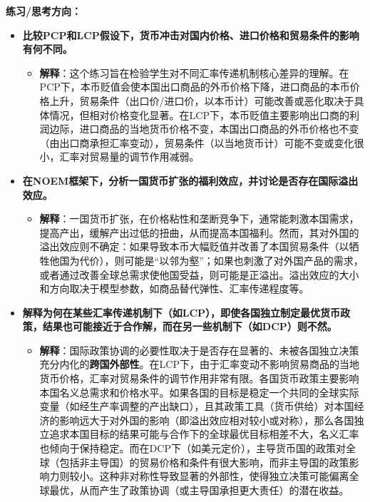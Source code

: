 \documentclass[12pt]{article}
\begin{document}
\textbf{练习/思考方向：}
\begin{itemize}
    \item \textbf{比较PCP和LCP假设下，货币冲击对国内价格、进口价格和贸易条件的影响有何不同。}
    \begin{itemize}
        \item \textbf{解释}：这个练习旨在检验学生对不同汇率传递机制核心差异的理解。在PCP下，本币贬值会使本国出口商品的外币价格下降，进口商品的本币价格上升，贸易条件（出口价/进口价，以本币计）可能改善或恶化取决于具体情况，但相对价格变化显著。在LCP下，本币贬值主要影响出口商的利润边际，进口商品的当地货币价格不变，本国出口商品的外币价格也不变（由出口商承担汇率变动），贸易条件（以当地货币计）可能不变或变化很小，汇率对贸易量的调节作用减弱。
    \end{itemize}
    \item \textbf{在NOEM框架下，分析一国货币扩张的福利效应，并讨论是否存在国际溢出效应。}
    \begin{itemize}
        \item \textbf{解释}：一国货币扩张，在价格粘性和垄断竞争下，通常能刺激本国需求，提高产出，缓解产出过低的扭曲，从而提高本国福利。然而，其对外国的溢出效应则不确定：如果导致本币大幅贬值并改善了本国贸易条件（以牺牲他国为代价），则可能是“以邻为壑”；如果也刺激了对外国产品的需求，或者通过改善全球总需求使他国受益，则可能是正溢出。溢出效应的大小和方向取决于模型参数，如商品替代弹性、汇率传递程度等。
    \end{itemize}
    \item \textbf{解释为何在某些汇率传递机制下（如LCP），即使各国独立制定最优货币政策，结果也可能接近于合作解，而在另一些机制下（如DCP）则不然。}
    \begin{itemize}
        \item \textbf{解释}：国际政策协调的必要性取决于是否存在显著的、未被各国独立决策充分内化的\textbf{跨国外部性}。在LCP下，由于汇率变动不影响贸易商品的当地货币价格，汇率对贸易条件的调节作用非常有限。各国货币政策主要影响本国名义总需求和价格水平。如果各国的目标是稳定一个共同的全球实际变量（如经生产率调整的产出缺口），且其政策工具（货币供给）对本国经济的影响远大于对外国的影响（即溢出效应相对较小或对称），那么各国独立追求本国目标的结果可能与合作下的全球最优目标相差不大，名义汇率也倾向于保持稳定。而在DCP下（如美元定价），主导货币国的政策对全球（包括非主导国）的贸易价格和条件有很大影响，而非主导国的政策影响力则较小。这种非对称性导致显著的外部性，使得独立决策可能偏离全球最优，从而产生了政策协调（或主导国承担更大责任）的潜在收益。
    \end{itemize}
\end{itemize}
\end{document}
